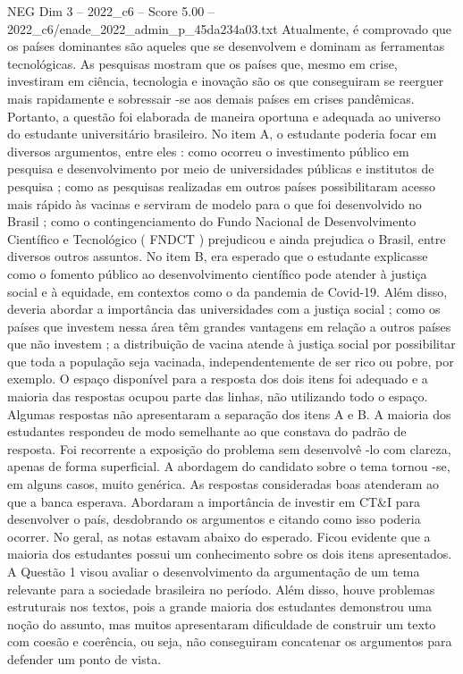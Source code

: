 \begin{textsample}{NEG Dim 3 – 2022\_c6 – Score 5.00 – 2022\_c6/enade\_2022\_admin\_p\_45da234a03.txt}
Atualmente, é comprovado que os países dominantes são aqueles que se desenvolvem e dominam as ferramentas tecnológicas.
As pesquisas mostram que os países que, mesmo em crise, investiram em ciência, tecnologia e inovação são os que conseguiram se reerguer mais rapidamente e sobressair -se aos demais países em crises pandêmicas.
Portanto, a questão foi elaborada de maneira oportuna e adequada ao universo do estudante universitário brasileiro.
No item A, o estudante poderia focar em diversos argumentos, entre eles : como ocorreu o investimento público em pesquisa e desenvolvimento por meio de universidades públicas e institutos de pesquisa ; como as pesquisas realizadas em outros países possibilitaram acesso mais rápido às vacinas e serviram de modelo para o que foi desenvolvido no Brasil ; como o contingenciamento do Fundo Nacional de Desenvolvimento Científico e Tecnológico ( FNDCT ) prejudicou e ainda prejudica o Brasil, entre diversos outros assuntos.
No item B, era esperado que o estudante explicasse como o fomento público ao desenvolvimento científico pode atender à justiça social e à equidade, em contextos como o da pandemia de Covid-19.
Além disso, deveria abordar a importância das universidades com a justiça social ; como os países que investem nessa área têm grandes vantagens em relação a outros países que não investem ; a distribuição de vacina atende à justiça social por possibilitar que toda a população seja vacinada, independentemente de ser rico ou pobre, por exemplo.
O espaço disponível para a resposta dos dois itens foi adequado e a maioria das respostas ocupou parte das linhas, não utilizando todo o espaço.
Algumas respostas não apresentaram a separação dos itens A e B.
A maioria dos estudantes respondeu de modo semelhante ao que constava do padrão de resposta.
Foi recorrente a exposição do problema sem desenvolvê -lo com clareza, apenas de forma superficial.
A abordagem do candidato sobre o tema tornou -se, em alguns casos, muito genérica.
As respostas consideradas boas atenderam ao que a banca esperava.
Abordaram a importância de investir em CT\&I para desenvolver o país, desdobrando os argumentos e citando como isso poderia ocorrer.
No geral, as notas estavam abaixo do esperado.
Ficou evidente que a maioria dos estudantes possui um conhecimento sobre os dois itens apresentados.
A Questão 1 visou avaliar o desenvolvimento da argumentação de um tema relevante para a sociedade brasileira no período.
Além disso, houve problemas estruturais nos textos, pois a grande maioria dos estudantes demonstrou uma noção do assunto, mas muitos apresentaram dificuldade de construir um texto com coesão e coerência, ou seja, não conseguiram concatenar os argumentos para defender um ponto de vista.

\end{textsample}
